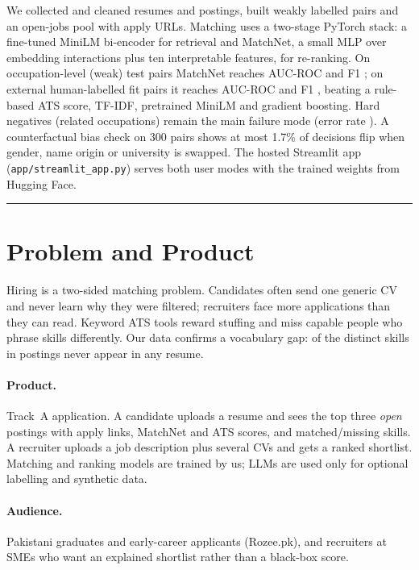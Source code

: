 \documentclass[11pt,a4paper]{article}
\newcommand{\phase}[1]{\vspace{0.6em}\noindent{\Large\bfseries\color{rmgrey}#1}\par\vspace{0.2em}\noindent\textcolor{rmgrey}{\rule{\linewidth}{0.6pt}}\par\vspace{0.3em}}
\newcommand{\code}[1]{\texttt{\small #1}}
\begin{document}
We collected and cleaned \ResFinal resumes and \JobFinal postings, built \Pairs weakly labelled
pairs and an open-jobs pool with apply URLs. Matching uses a two-stage PyTorch stack: a fine-tuned
MiniLM bi-encoder for retrieval and MatchNet, a small MLP over embedding interactions plus ten
interpretable features, for re-ranking. On occupation-level (weak) test pairs MatchNet reaches
AUC-ROC \ResAAuc and F1 \ResAF; on external human-labelled fit pairs it reaches AUC-ROC \ResBAuc
and F1 \ResBF, beating a rule-based ATS score, TF-IDF, pretrained MiniLM and gradient boosting.
Hard negatives (related occupations) remain the main failure mode (error rate \ErrHard). A
counterfactual bias check on 300 pairs shows at most 1.7\% of decisions flip when gender, name
origin or university is swapped. The hosted Streamlit app (\code{app/streamlit\_app.py}) serves
both user modes with the trained weights from Hugging Face.

\phase{Phase 1: Problem Definition}

\section{Problem and Product}
Hiring is a two-sided matching problem. Candidates often send one generic CV and never learn why
they were filtered; recruiters face more applications than they can read. Keyword ATS tools reward
stuffing and miss capable people who phrase skills differently. Our data confirms a vocabulary
gap: \SkillsJobOnly of the \SkillsUniqJobs distinct skills in postings never appear in any resume.

\paragraph{Product.} Track~A application. A candidate uploads a resume and sees the top three
\emph{open} postings with apply links, MatchNet and ATS scores, and matched/missing skills. A
recruiter uploads a job description plus several CVs and gets a ranked shortlist. Matching and
ranking models are trained by us; LLMs are used only for optional labelling and synthetic data.

\paragraph{Audience.} Pakistani graduates and early-career applicants (Rozee.pk), and recruiters
at SMEs who want an explained shortlist rather than a black-box score.
\end{document}
